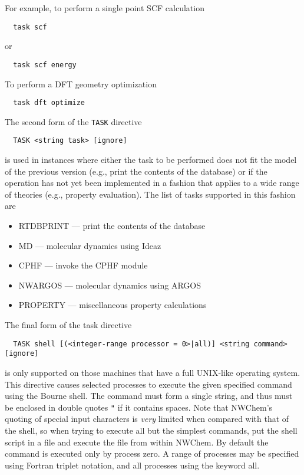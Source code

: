 For example, to perform a single point SCF calculation
\begin{verbatim}
  task scf
\end{verbatim}
or
\begin{verbatim}
  task scf energy
\end{verbatim}
To perform a DFT geometry optimization
\begin{verbatim}
  task dft optimize
\end{verbatim}

The second form of the \verb+TASK+ directive
\begin{verbatim}
  TASK <string task> [ignore]
\end{verbatim}
is used in instances where either the task to be performed does not
fit the model of the previous version (e.g., print the contents of the
database) or if the operation has not yet been implemented in a
fashion that applies to a wide range of theories (e.g., property
evaluation).  The list of tasks supported in this fashion are
\begin{itemize}
  \item RTDBPRINT --- print the contents of the database
  \item MD --- molecular dynamics using Ideaz
  \item CPHF --- invoke the CPHF module
  \item NWARGOS --- molecular dynamics using ARGOS
  \item PROPERTY --- miscellaneous property calculations
\end{itemize}

The final form of the task directive
\begin{verbatim}
  TASK shell [(<integer-range processor = 0>|all)] <string command> [ignore]
\end{verbatim}
is only supported on those machines that have a full UNIX-like
operating system.  This directive causes selected processes to execute
the given specified command using the Bourne shell.  The command must
form a single string, and thus must be enclosed in double quotes
\verb+"+ if it contains spaces.  Note that NWChem's quoting of
special input characters is {\em very} limited when compared with that
of the shell, so when trying to execute all but the simplest commands,
put the shell script in a file and execute the file from within
NWChem.  By default the command is executed only by process zero.  A
range of processes may be specified using Fortran triplet notation,
and all processes using the keyword all.


